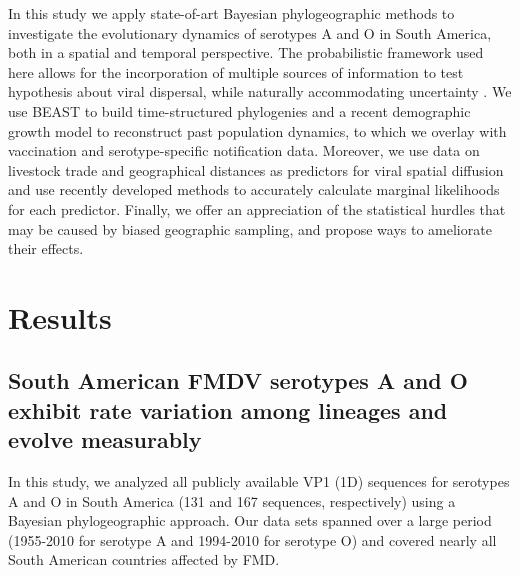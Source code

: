 \documentclass[10pt]{article}
\begin{document}
In this study we apply state-of-art Bayesian phylogeographic methods
to investigate the evolutionary dynamics of serotypes A and O in South America, both in a spatial and temporal perspective. The probabilistic framework used here allows for the incorporation of multiple sources of information to test hypothesis about viral dispersal, while naturally accommodating uncertainty \cite{roots,towards}.
We use BEAST \cite{beast2012} 
to build time-structured phylogenies and a recent demographic growth model \cite{skygrid} to reconstruct past population dynamics, to which we overlay with vaccination and serotype-specific notification data.
Moreover, we use data on livestock trade and geographical distances as predictors for viral spatial diffusion and use recently developed methods to accurately calculate marginal likelihoods for each predictor.
Finally, we offer an appreciation of the statistical hurdles that may be caused by biased geographic sampling, and propose ways to ameliorate their effects.

\section*{Results}

\subsection*{South American FMDV serotypes A and O exhibit rate variation among lineages and evolve measurably}

In this study, we analyzed all publicly available VP1 (1D) sequences for serotypes A and O in South America (131 and 167 sequences, respectively) using a Bayesian phylogeographic approach. Our data sets spanned over a large period (1955-2010 for serotype A and 1994-2010 for serotype O)  and covered nearly all South American countries affected by FMD.


\end{document}
